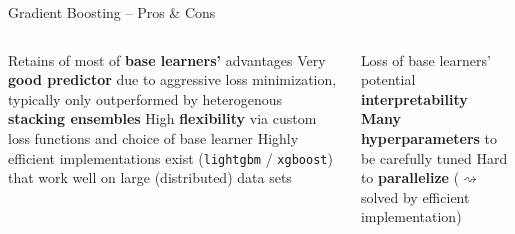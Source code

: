 \begin{frame}{Gradient Boosting -- Pros \& Cons}

\footnotesize

\begin{columns}[onlytextwidth]
  \begin{column}{0.5\textwidth}
    \footnotesize
    \begin{itemize}
      \positem Retains of most of \textbf{base learners'} advantages 
      \positem Very \textbf{good predictor} due to aggressive loss minimization, typically only outperformed by heterogenous \textbf{stacking ensembles}
      \positem High \textbf{flexibility} via custom loss functions and choice of base learner
      \positem Highly efficient implementations exist (\texttt{lightgbm} / \texttt{xgboost}) that work well on large (distributed) data sets
    \end{itemize}
  \end{column}
  \begin{column}{0.5\textwidth}
    \footnotesize
    \begin{itemize}
      \negitem Loss of base learners' potential \textbf{interpretability}
      \negitem \textbf{Many hyperparameters} 
      to be carefully tuned
      \negitem Hard to \textbf{parallelize} ($\rightsquigarrow$ solved by efficient implementation)
    \end{itemize}
  \end{column}
\end{columns}

\end{frame}